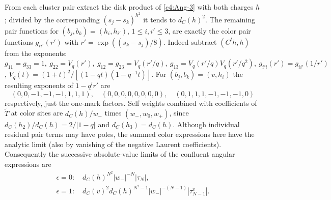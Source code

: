 From each cluster pair extract the disk product of \eqref{c4:Ang-3} with both charges \(h\); divided by the corresponding \((s_j-s_k)^{h^2}\) it tends to \(d_C(h)^2\). The remaining pair functions for \((b_j,b_k)=(h_i,h_{i'})\), \(1\le i,i'\le3\), are exactly the color pair functions \(g_{ii'}(r')\) with \(r'=\exp((s_k-s_j)/8)\). Indeed subtract \((C^l h,h)\) from the exponents: \(g_{11}=g_{33}=1,\ g_{22}=V_q(r'),\ g_{12}=g_{23}=V_q(r'/q),\ g_{13}=V_q(r'/q)V_q(r'/q^2),\ g_{i'i}(r')=g_{ii'}(1/r')\), \(V_q(t)=(1+t)^2/[(1-qt)(1-q^{-1}t)]\). For \((b_j,b_k)=(v,h_i)\) the resulting exponents of \(1-q^l r'\) are
\[
 (0,0,-1,-1,-1,1,1,1),\quad (0,0,0,0,0,0,0,0),\quad (0,1,1,1,-1,-1,-1,0)
\]
respectively, just the one-mark factors. Self weights combined with coefficients of \(\widetilde T\) at color sites are \(d_C(h)/w_-\) times \((w_-,w_0,w_+)\), since \(d_C(h_2)/d_C(h)=2/|1-q|\) and \(d_C(h_3)=d_C(h)\). Although individual residual pair terms may have poles, the summed color expressions here have the analytic limit (also by vanishing of the negative Laurent coefficients). Consequently the successive absolute-value limits of the confluent angular expressions are
\begin{equation}
 \begin{array}{ll}
 \epsilon=0:\quad d_C(h)^{N^2}|w_-|^{-N}|\tau_N|,\\
 \epsilon=1:\quad d_C(v)^2 d_C(h)^{N^2-1}|w_-|^{-(N-1)}|\tau^v_{N-1}|.
 \end{array}                                                              \label{c4:Ang-4}
\end{equation}

